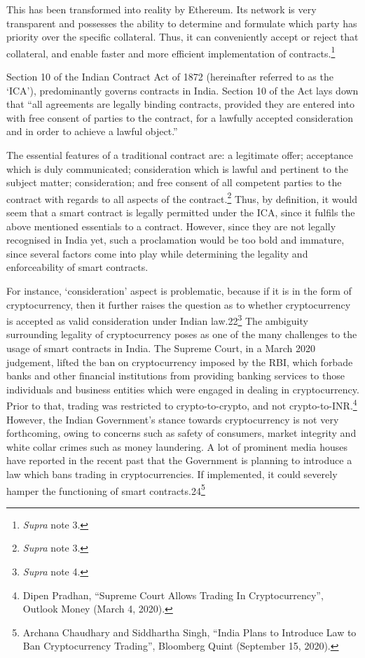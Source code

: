 \begin{multicols}{2}
\noi
This has been transformed into reality by Ethereum. Its network is very transparent and
possesses the ability to determine and formulate which party has priority over the specific
collateral. Thus, it can conveniently accept or reject that collateral, and enable faster and
more efficient implementation of contracts.\footnote{\textit{Supra} note 3.}


\noi
Section 10 of the Indian Contract Act of 1872 (hereinafter referred to as the ‘ICA’),
predominantly governs contracts in India. Section 10 of the Act lays down that “all
agreements are legally binding contracts, provided they are entered into with free consent of
parties to the contract, for a lawfully accepted consideration and in order to achieve a lawful
object.”

\noi
The essential features of a traditional contract are: a legitimate offer; acceptance which is
duly communicated; consideration which is lawful and pertinent to the subject matter;
consideration; and free consent of all competent parties to the contract with regards to all
aspects of the contract.\footnote{\textit{Supra} note 3.} Thus, by definition, it would seem that a smart contract is legally
permitted under the ICA, since it fulfils the above mentioned essentials to a contract.
However, since they are not legally recognised in India yet, such a proclamation would be too
bold and immature, since several factors come into play while determining the legality and
enforceability of smart contracts. 

\noi
For instance, ‘consideration’ aspect is problematic, because if it is in the form of
cryptocurrency, then it further raises the question as to whether cryptocurrency is accepted as valid consideration under Indian law.22\footnote{\textit{Supra} note 4.} The ambiguity surrounding legality of cryptocurrency
poses as one of the many challenges to the usage of smart contracts in India. The Supreme
Court, in a March 2020 judgement, lifted the ban on cryptocurrency imposed by the RBI,
which forbade banks and other financial institutions from providing banking services to those
individuals and business entities which were engaged in dealing in cryptocurrency. Prior to
that, trading was restricted to crypto-to-crypto, and not crypto-to-INR.\footnote{Dipen Pradhan, “Supreme Court Allows Trading In Cryptocurrency”, Outlook Money (March 4, 2020).} However, the Indian
Government’s stance towards cryptocurrency is not very forthcoming, owing to concerns
such as safety of consumers, market integrity and white collar crimes such as money
laundering. A lot of prominent media houses have reported in the recent past that the
Government is planning to introduce a law which bans trading in cryptocurrencies. If
implemented, it could severely hamper the functioning of smart contracts.24\footnote{Archana Chaudhary and Siddhartha Singh, “India Plans to Introduce Law to Ban Cryptocurrency Trading”,
Bloomberg Quint (September 15, 2020).}


\end{multicols}
